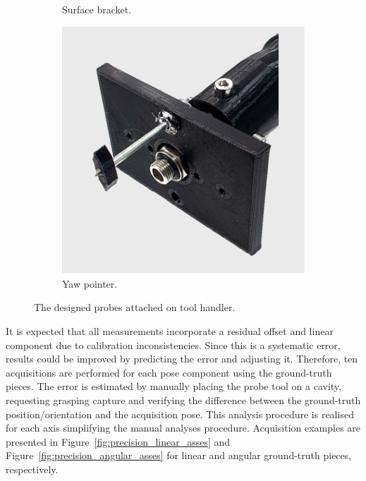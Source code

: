 \begin{figure}[h!]
{\begin{tcolorbox}
\begin{subfigure}[c]{.30\textwidth}
          \caption{Surface bracket.}
          \label{fig:surface_bracket_probe_pointer}
      \end{subfigure}
      \hfill
      \begin{subfigure}[c]{.25\textwidth}
          \centering
          \includegraphics[trim={1cm 3cm 6cm 4cm},clip,width=1\linewidth,angle=0]{Cap5/Figuras/ponta_prova_yaw.pdf}
          \caption{Yaw pointer.}
          \label{fig:yaw_probe_pointer}
      \end{subfigure}
     \end{tcolorbox}
     \caption{The designed probes attached on tool handler.}
     \label{fig:probe_pointers}
   }%
 \end{figure}
 
 
It is expected that all measurements incorporate a residual offset and linear component due to calibration inconsistencies. Since this is a systematic error, results could be improved by predicting the error and adjusting it. Therefore, ten acquisitions are performed for each pose component using the ground-truth pieces. The error is estimated by manually placing the probe tool on a cavity, requesting grasping capture and verifying the difference between the ground-truth position/orientation and the acquisition pose. This analysis procedure is realised for each axis simplifying the manual analyses procedure. Acquisition examples are presented in Figure~\ref{fig:precision_linear_asses} and Figure~\ref{fig:precision_angular_asses} for linear and angular ground-truth pieces, respectively.

